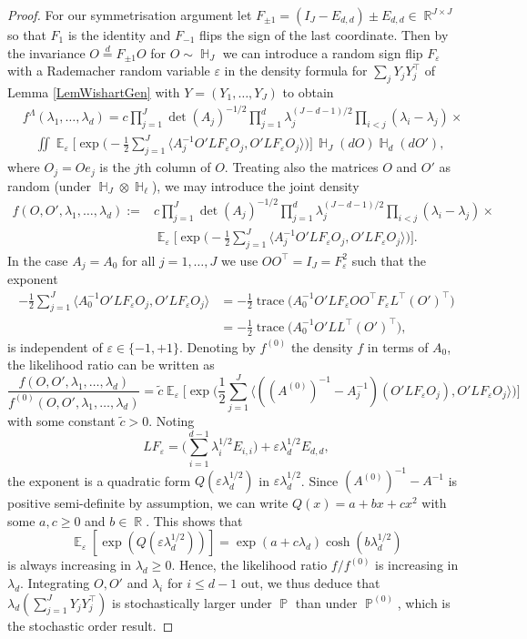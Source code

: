 \documentclass[preprint,aos]{imsart}
\numberwithin{equation}{section}
\theoremstyle{remark}
\DeclareMathOperator{\E}{{\mathbb E}}
\DeclareMathOperator{\R}{{\mathbb R}}
\DeclareMathOperator{\HH}{{\mathbb H}}
\DeclareMathOperator{\PP}{{\mathbb P}}
\DeclareMathOperator{\trace}{trace}
\providecommand{\eps}{\varepsilon}
\providecommand{\scapro}[2]{\langle #1,#2 \rangle}
\renewcommand{\le}{\leqslant}
\renewcommand{\ge}{\geqslant}
\begin{document}
\begin{appendix}
\begin{proof}
For our  symmetrisation argument let $F_{\pm 1}=(I_{J}-E_{d,d})\pm E_{d,d}\in \R^{J\times J}$ so that $F_1$ is the identity and $F_{-1}$ flips the sign of the last coordinate. Then by the invariance $O\stackrel{d}{=} F_{\pm 1} O$ for $O\sim\HH_J$  we can introduce a random sign flip $F_\eps$ with a Rademacher random variable $\eps$ in the density formula for $\sum_jY_jY_j^\top$ of Lemma \ref{LemWishartGen} with $Y=(Y_1,\ldots,Y_J)$ to obtain
\begin{align*}
&f^\Lambda(\lambda_1,\ldots,\lambda_{d})=c\prod_{j=1}^J\det(A_j)^{-1/2}\prod_{j=1}^{d}\lambda_j^{(J-d-1)/2}\prod_{i<j}(\lambda_i-\lambda_j)\times\\
&
\quad\iint \E_\eps\Big[\exp\Big(-\frac12\sum_{j=1}^J\scapro{A_j^{-1}O' LF_\eps O_j}{O' LF_\eps O_j} \Big)\Big]\,\HH_J(dO)\HH_d(dO'),
\end{align*}
where $O_j=Oe_j$ is the $j$th column of $O$.
Treating also the matrices $O$ and $O'$ as random (under $\HH_J\otimes\HH_\ell$), we may introduce the joint density
\begin{align*}
f(O,O',\lambda_1,\ldots,\lambda_{d})
:=&c\prod_{j=1}^J\det(A_j)^{-1/2}\prod_{j=1}^{d}\lambda_j^{(J-d -1)/2}\prod_{i<j}(\lambda_i-\lambda_j)\times\\
&\E_\eps\Big[\exp\Big(-\frac12\sum_{j=1}^J\scapro{A_j^{-1}O' LF_\eps O_j}{O' LF_\eps O_j} \Big)\Big].
\end{align*}
In the case $A_j=A_0$ for all $j=1,\ldots,J$ we use $OO^\top=I_{J}=F_\eps^2$ such that the exponent
\begin{align*}
-\frac12\sum_{j=1}^J\scapro{A_0^{-1}O' LF_\eps O_j}{O' LF_\eps O_j} &=-\frac12\trace\Big(A_0^{-1}O' LF_\eps O O^\top F_\eps L^\top (O')^\top\Big)\\
&=
-\frac12\trace\Big(A_0^{-1}O' L L^\top (O')^\top\Big),
\end{align*}
is independent of $\eps\in\{-1,+1\}$. Denoting by $f^{(0)}$ the density $f$ in terms of $A_0$,
the likelihood ratio can be written as
\[\frac{f(O,O',\lambda_1,\ldots,\lambda_{d})}{f^{(0)}(O,O',\lambda_1,\ldots,\lambda_{d})}=\tilde c \E_\eps\Big[ \exp\Big(\frac12\sum_{j=1}^J\scapro{((A^{(0)})^{-1}-A_j^{-1})(O' LF_\eps O_j)}{O' LF_\eps O_j}\Big)\Big]
\]
with some constant $\tilde c>0$. Noting
\[LF_\eps=\Big(\sum_{i=1}^{d-1}\lambda_i^{1/2}E_{i,i}\Big)+\eps \lambda_{d}^{1/2}E_{d,d},\]
the exponent is a quadratic form $Q(\eps\lambda_{d}^{1/2})$ in $\eps \lambda_{d}^{1/2}$. Since $(A^{(0)})^{-1}-A^{-1}$ is positive semi-definite by assumption, we can write $Q(x)=a+bx+cx^2$ with some $a,c\ge 0$ and $b\in\R$. This shows that
\[ \E_\eps[\exp(Q(\eps \lambda_{d}^{1/2}))]= \exp(a+c\lambda_{d})\cosh(b\lambda_{d}^{1/2})\]
is always increasing in $\lambda_{d}\ge 0$. Hence,  the likelihood ratio $f/f^{(0)}$ is increasing in $\lambda_{d}$. Integrating $O,O'$ and $\lambda_i$ for $i\le d-1$ out, we thus deduce that $\lambda_d(\sum_{j=1}^JY_jY_j^\top)$ is stochastically larger under $\PP$ than under $\PP^{(0)}$, which is the stochastic order result.


\end{proof}
\end{appendix}
\end{document}
